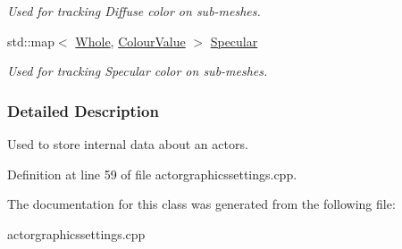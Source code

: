 \begin{DoxyCompactItemize}
\begin{DoxyCompactList}\small\item\em Used for tracking Diffuse color on sub-\/meshes. \item\end{DoxyCompactList}\item 
\hypertarget{classphys_1_1internal_1_1InternalActorGraphicsSettings_affba686bba9be08fee3af07ccee4711a}{
std::map$<$ \hyperlink{namespacephys_a460f6bc24c8dd347b05e0366ae34f34a}{Whole}, \hyperlink{classphys_1_1ColourValue}{ColourValue} $>$ \hyperlink{classphys_1_1internal_1_1InternalActorGraphicsSettings_affba686bba9be08fee3af07ccee4711a}{Specular}}
\label{d6/d6f/classphys_1_1internal_1_1InternalActorGraphicsSettings_affba686bba9be08fee3af07ccee4711a}

\begin{DoxyCompactList}\small\item\em Used for tracking Specular color on sub-\/meshes. \item\end{DoxyCompactList}\end{DoxyCompactItemize}


\subsubsection{Detailed Description}
Used to store internal data about an actors. 

Definition at line 59 of file actorgraphicssettings.cpp.



The documentation for this class was generated from the following file:\begin{DoxyCompactItemize}
\item 
actorgraphicssettings.cpp\end{DoxyCompactItemize}

